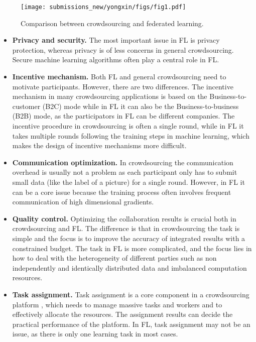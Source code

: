 \documentclass[11pt]{article}
\begin{document}
\begin{figure}
\centering
\texttt{[image: submissions\_new/yongxin/figs/fig1.pdf]}
\caption{Comparison between crowdsourcing and federated learning.}
\label{fig:comparison}
\end{figure}

\begin{itemize}
	\item \textbf{Privacy and security.} 
	The most important issue in FL is privacy protection, whereas privacy is of less concerns in general crowdsourcing. 
	Secure machine learning algorithms often play a central role in FL. 
	\item \textbf{Incentive mechanism.} 
	Both FL and general crowdsourcing need to motivate participants. 
	However, there are two differences. 
	The incentive mechanism in many crowdsourcing applications is based on the Business-to-customer (B2C) mode while in FL it can also be the Business-to-business (B2B) mode, as the participators in FL can be different companies. 
	The incentive procedure in crowdsourcing is often a single round, while in FL it takes multiple rounds following the training steps in machine learning, which makes the design of incentive mechanisms more difficult.
	\item \textbf{Communication optimization.} 
	In crowdsourcing the communication overhead is usually not a problem as each participant only has to submit small data (like the label of a picture) for a single round. 
	However, in FL it can be a core issue because the training process often involves frequent communication of high dimensional gradients. 
	\item \textbf{Quality control.} 
	Optimizing the collaboration results is crucial both in crowdsourcing and FL. 
	The difference is that in crowdsourcing the task is simple and the focus is to improve the accuracy of integrated results with a constrained budget. 
	The task in FL is more complicated, and the focus lies in how to deal with the heterogeneity of different parties such as non independently and identically distributed data and imbalanced computation resources.
	\item \textbf{Task assignment.} 
	Task assignment is a core component in a crowdsourcing platform \cite{DBLP:conf/icde/TongSDWC16, 8897719}, which needs to manage massive tasks and workers and to effectively allocate the resources. 
	The assignment results can decide the practical performance of the platform. 
	In FL, task assignment may not be an issue, as there is only one learning task in most cases. 
\end{itemize}
\end{document}

